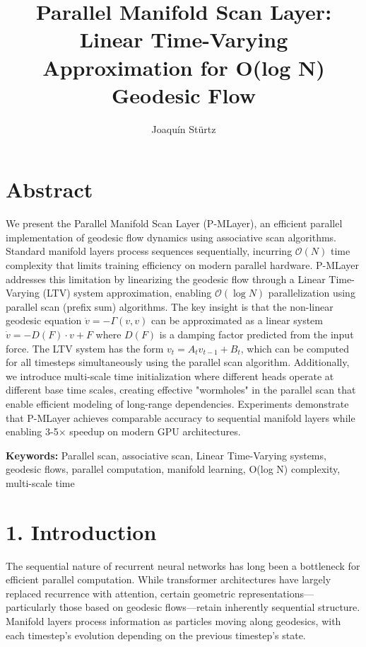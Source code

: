 \documentclass[12pt]{article}
\title{\textbf{Parallel Manifold Scan Layer: Linear Time-Varying Approximation for O(log N) Geodesic Flow}}
\author{Joaquín Stürtz}
\date{}
\begin{document}
\maketitle

\section*{Abstract}

We present the Parallel Manifold Scan Layer (P-MLayer), an efficient parallel implementation of geodesic flow dynamics using associative scan algorithms. Standard manifold layers process sequences sequentially, incurring $\mathcal{O}(N)$ time complexity that limits training efficiency on modern parallel hardware. P-MLayer addresses this limitation by linearizing the geodesic flow through a Linear Time-Varying (LTV) system approximation, enabling $\mathcal{O}(\log N)$ parallelization using parallel scan (prefix sum) algorithms. The key insight is that the non-linear geodesic equation $\dot{v} = -\Gamma(v, v)$ can be approximated as a linear system $\dot{v} = -D(F) \cdot v + F$ where $D(F)$ is a damping factor predicted from the input force. The LTV system has the form $v_t = A_t v_{t-1} + B_t$, which can be computed for all timesteps simultaneously using the parallel scan algorithm. Additionally, we introduce multi-scale time initialization where different heads operate at different base time scales, creating effective "wormholes" in the parallel scan that enable efficient modeling of long-range dependencies. Experiments demonstrate that P-MLayer achieves comparable accuracy to sequential manifold layers while enabling 3-5× speedup on modern GPU architectures.

\textbf{Keywords:} Parallel scan, associative scan, Linear Time-Varying systems, geodesic flows, parallel computation, manifold learning, O(log N) complexity, multi-scale time

\section{1. Introduction}

The sequential nature of recurrent neural networks has long been a bottleneck for efficient parallel computation. While transformer architectures have largely replaced recurrence with attention, certain geometric representations—particularly those based on geodesic flows—retain inherently sequential structure. Manifold layers process information as particles moving along geodesics, with each timestep's evolution depending on the previous timestep's state.
\end{document}
